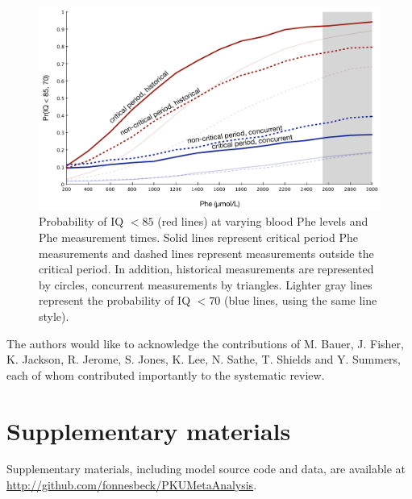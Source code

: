 \documentclass{svjour3}                     %
\begin{document}
\begin{figure}[p]
    \includegraphics[width=\textwidth]{figure.pdf}

    \caption{Probability of IQ $<85$ (red lines) at varying blood Phe levels and Phe measurement times. Solid lines represent critical period Phe measurements and dashed lines represent measurements outside the critical period. In addition, historical measurements are represented by circles, concurrent measurements by triangles. Lighter gray lines represent the probability of IQ $<70$ (blue lines, using the same line style).} \label{fig:probs}
\end{figure}


\begin{acknowledgements}
The authors would like to acknowledge the contributions of M. Bauer, J. Fisher, K. Jackson, R. Jerome, S. Jones, K. Lee, N. Sathe, T. Shields and Y. Summers, each of whom contributed importantly to the systematic review.
\end{acknowledgements}

\appendix
\section{Supplementary materials} %
\label{sec:Supplementary materials}

Supplementary materials, including model source code and data, are available at \url{http://github.com/fonnesbeck/PKUMetaAnalysis}.






\end{document}
